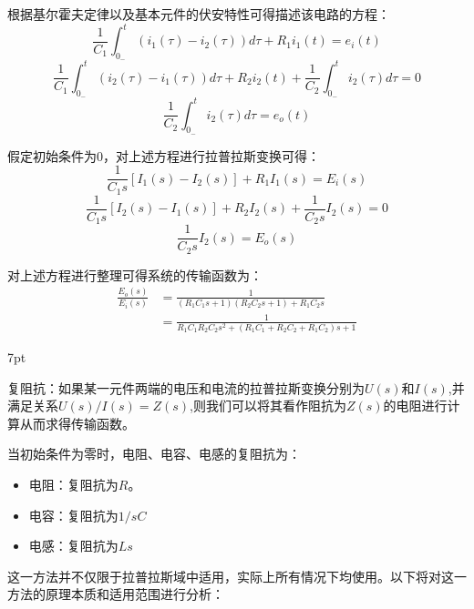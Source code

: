 \documentclass{article}
\numberwithin{equation}{section}
\numberwithin{figure}{section}
\newenvironment{formal}{%
\def\FrameCommand{%
\hspace{1pt}%
{\color{DarkBlue}\vrule width 2pt}%
{\color{formalshade}\vrule width 4pt}%
\colorbox{formalshade}%
}%
\MakeFramed{\advance\hsize-\width\FrameRestore}%
\noindent\hspace{-4.55pt}%
\begin{adjustwidth}{}{7pt}%
\vspace{2pt}\vspace{2pt}%
}
{%
\vspace{2pt}\end{adjustwidth}\endMakeFramed%
}
\begin{document}
根据基尔霍夫定律以及基本元件的伏安特性可得描述该电路的方程：
\begin{equation}
    \frac{1}{C_1}\int_{0_-}^{t}(i_1(\tau)-i_2(\tau))d\tau+R_1i_1(t)=e_i(t)
\end{equation}
\begin{equation}
    \frac{1}{C_1}\int_{0_-}^{t}(i_2(\tau)-i_1(\tau))d\tau+R_2i_2(t)+\frac{1}{C_2}\int_{0_-}^{t}i_2(\tau)d\tau=0
\end{equation}
\begin{equation}
    \frac{1}{C_2}\int_{0_-}^{t}i_2(\tau)d\tau=e_o(t)
\end{equation}

假定初始条件为0，对上述方程进行拉普拉斯变换可得：
\begin{equation}
    \frac{1}{C_1s}[I_1(s)-I_2(s)]+R_1I_1(s)=E_i(s)
\end{equation}
\begin{equation}
    \frac{1}{C_1s}[I_2(s)-I_1(s)]+R_2I_2(s)+\frac{1}{C_2s}I_2(s)=0
\end{equation}
\begin{equation}
    \frac{1}{C_2s}I_2(s)=E_o(s)
\end{equation}

对上述方程进行整理可得系统的传输函数为：
\begin{equation}
    \begin{split}
        \frac{E_o(s)}{E_i(s)}&=\frac{1}{(R_1C_1s+1)(R_2C_2s+1)+R_1C_2s}\\
        &=\frac{1}{R_1C_1R_2C_2s^2+(R_1C_1+R_2C_2+R_1C_2)s+1}
    \end{split}
\end{equation}

\begin{formal}
    复阻抗：如果某一元件两端的电压和电流的拉普拉斯变换分别为$U(s)$和$I(s)$,并满足关系$U(s)/I(s)=Z(s)$,则我们可以将其看作阻抗为$Z(s)$的电阻进行计算从而求得传输函数。
    
    当初始条件为零时，电阻、电容、电感的复阻抗为：
    \begin{itemize}
        \item 电阻：复阻抗为$R$。
        \item 电容：复阻抗为$1/sC$
        \item 电感：复阻抗为$Ls$
    \end{itemize}
\end{formal}

这一方法并不仅限于拉普拉斯域中适用，实际上所有情况下均使用。以下将对这一方法的原理本质和适用范围进行分析：
\end{document}
